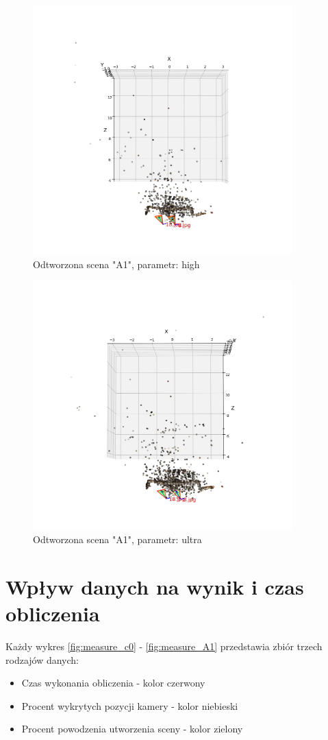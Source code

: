 \begin{figure}[h]
   \centering
   \includegraphics[width=10cm]{preset_A1/high.png}
   \caption{Odtworzona scena "A1", parametr: high}
   \label {fig:preset_A1_high}
\end{figure}
\begin{figure}[h]
   \centering
   \includegraphics[width=10cm]{preset_A1/ultra.png}
   \caption{Odtworzona scena "A1", parametr: ultra}
   \label {fig:preset_A1_ultra}
\end{figure}

\section{Wpływ danych na wynik i czas obliczenia}
Każdy wykres \ref{fig:measure_c0} - \ref{fig:measure_A1} przedstawia zbiór trzech rodzajów danych:
\begin{itemize}
   \item Czas wykonania obliczenia - kolor czerwony
   \item Procent wykrytych pozycji kamery - kolor niebieski
   \item Procent powodzenia utworzenia sceny - kolor zielony
\end{itemize}

